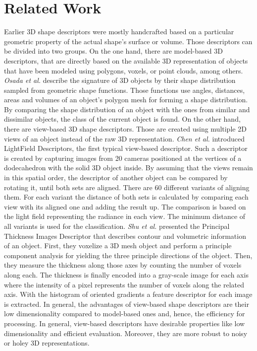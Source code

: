\chapter{Related Work}
\label{sec:related-work}
Earlier 3D shape descriptors were mostly handcrafted based on a particular geometric property of the actual shape's surface or volume.
Those descriptors can be divided into two groups.
On the one hand, there are model-based 3D descriptors, that are directly based on the available 3D representation of objects that have been modeled using polygons, voxels, or point clouds, among others.
\textit{Osada et al.} \cite{Osada:2001:MMS:882486.884103} describe the signature of 3D objects by their shape distribution sampled from geometric shape functions.
Those functions use angles, distances, areas and volumes of an object's polygon mesh for forming a shape distribution.
By comparing the shape distribution of an object with the ones from similar and dissimilar objects, the class of the current object is found.
On the other hand, there are view-based 3D shape descriptors.
Those are created using multiple 2D views of an object instead of the raw 3D representation.
\textit{Chen et al.} \cite{Chen2003} introduced LightField Descriptors, the first typical view-based descriptor.
Such a descriptor is created by capturing images from 20 cameras positioned at the vertices of a dodecahedron with the solid 3D object inside.
By assuming that the views remain in this spatial order, the descriptor of another object can be compared by rotating it, until both sets are aligned.
There are 60 different variants of aligning them.
For each variant the distance of both sets is calculated by comparing each view with its aligned one and adding the result up.
The comparison is based on the light field representing the radiance in each view.
The minimum distance of all variants is used for the classification.
\textit{Shu et al.} \cite{Shu:2016:MCV:2965260.2965467} presented the Principal Thickness Images Descriptor that describes contour and volumetric information of an object.
First, they voxelize a 3D mesh object and perform a principle component analysis for yielding the three principle directions of the object.
Then, they measure the thickness along those axes by counting the number of voxels along each.
The thickness is finally encoded into a gray-scale image for each axis where the intensity of a pixel represents the number of voxels along the related axis.
With the histogram of oriented gradients a feature descriptor for each image is extracted.
In general, the advantages of view-based shape descriptors are their low dimensionality compared to model-based ones and, hence, the efficiency for processing.
In general, view-based descriptors have desirable properties like low dimensionality and efficient evaluation.
Moreover, they are more robust to noisy or holey 3D representations.

